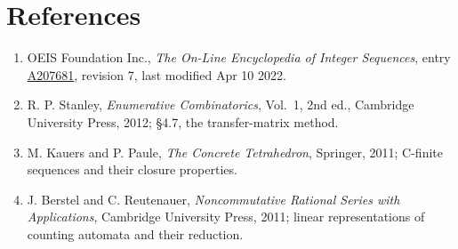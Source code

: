 \documentclass[11pt]{article}
\theoremstyle{definition}
\begin{document}
\section{References}

\begin{enumerate}

\item OEIS Foundation Inc., \emph{The On-Line Encyclopedia of Integer Sequences}, entry \href{https://oeis.org/A207681}{A207681}, revision 7, last modified Apr 10 2022.

\item R. P. Stanley, \emph{Enumerative Combinatorics}, Vol.~1, 2nd ed., Cambridge University Press, 2012; \S4.7, the transfer-matrix method.

\item M. Kauers and P. Paule, \emph{The Concrete Tetrahedron}, Springer, 2011; C-finite sequences and their closure properties.

\item J. Berstel and C. Reutenauer, \emph{Noncommutative Rational Series with Applications}, Cambridge University Press, 2011; linear representations of counting automata and their reduction.

\end{enumerate}
\end{document}
